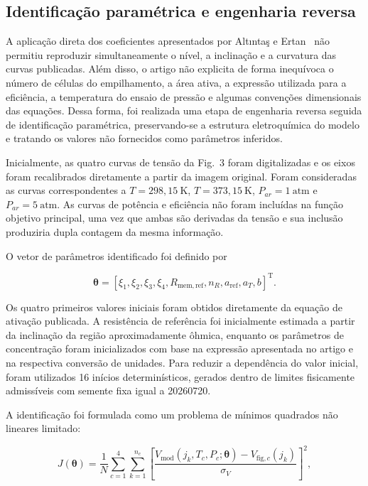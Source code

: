\subsection{Identificação paramétrica e engenharia reversa}

A aplicação direta dos coeficientes apresentados por Altıntaş e
Ertan~\cite{altintas2024} não permitiu reproduzir simultaneamente o nível,
a inclinação e a curvatura das curvas publicadas. Além disso, o artigo não
explicita de forma inequívoca o número de células do empilhamento, a área
ativa, a expressão utilizada para a eficiência, a temperatura do ensaio de
pressão e algumas convenções dimensionais das equações. Dessa forma, foi
realizada uma etapa de engenharia reversa seguida de identificação
paramétrica, preservando-se a estrutura eletroquímica do modelo e tratando
os valores não fornecidos como parâmetros inferidos.

Inicialmente, as quatro curvas de tensão da Fig.~3 foram digitalizadas e os
eixos foram recalibrados diretamente a partir da imagem original. Foram
consideradas as curvas correspondentes a $T=298{,}15~\mathrm{K}$,
$T=373{,}15~\mathrm{K}$, $P_{ar}=1~\mathrm{atm}$ e
$P_{ar}=5~\mathrm{atm}$. As curvas de potência e eficiência não foram
incluídas na função objetivo principal, uma vez que ambas são derivadas da
tensão e sua inclusão produziria dupla contagem da mesma informação.

O vetor de parâmetros identificado foi definido por

\begin{equation}
\boldsymbol{\theta}=
\left[
\xi_1,\xi_2,\xi_3,\xi_4,
R_{\mathrm{mem,ref}},n_R,
a_{\mathrm{ref}},a_T,b
\right]^{\mathrm{T}}.
\end{equation}

Os quatro primeiros valores iniciais foram obtidos diretamente da equação
de ativação publicada. A resistência de referência foi inicialmente
estimada a partir da inclinação da região aproximadamente ôhmica, enquanto
os parâmetros de concentração foram inicializados com base na expressão
apresentada no artigo e na respectiva conversão de unidades. Para reduzir a
dependência do valor inicial, foram utilizados 16 inícios determinísticos,
gerados dentro de limites fisicamente admissíveis com semente fixa igual a
20260720.

A identificação foi formulada como um problema de mínimos quadrados não
lineares limitado:

\begin{equation}
J(\boldsymbol{\theta})=
\frac{1}{N}
\sum_{c=1}^{4}
\sum_{k=1}^{n_c}
\left[
\frac{
V_{\mathrm{mod}}(j_k,T_c,P_c;\boldsymbol{\theta})-
V_{\mathrm{fig},c}(j_k)
}{\sigma_V}
\right]^2,
\end{equation}


